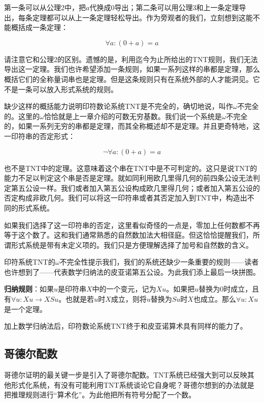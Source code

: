 \documentclass{article}
\begin{document}
第一条可以从公理2中，把$a$代换成0导出；第二条可以用公理3和上一条定理导出，每条定理都可以从上一条定理轻松导出。作为旁观者的我们，立刻想到这能不能概括成一条定理：

\[
\forall a: (0 + a) = a
\]

请注意它和公理2的区别。遗憾的是，利用迄今为止所给出的TNT规则，我们无法导出这一定理。我们也许希望添加一条规则，如果一系列这样的串都是定理，那么概括它们的全称量词串也是定理。但是这条规则只有在系统外部的人才能洞见。它不是一条可以放入形式系统的规则。

缺少这样的概括能力说明印符数论系统TNT是不完全的，确切地说，叫作$\omega$不完全的。这里的$\omega$恰恰就是上一章介绍的可数无穷基数。我们说一个系统是$\omega$不完全的，如果一系列无穷的串都是定理，而其全称概述却不是定理。并且更奇特地，这一印符串的否定形式：

\[
\lnot \forall a: (0 + a) = a
\]

也不是TNT中的定理。这意味着这个串在TNT中是不可判定的。这只是说TNT的能力不足以判定这个串是否是定理。就如同利用欧几里得几何的前四条公设无法判定第五公设一样。我们或者加入第五公设构成欧几里得几何；或者加入第五公设的否定构成非欧几何。我们可以将这一印符串或者其否定加入到TNT中，构造出不同的形式系统。

如果我们选择了这一印符串的否定，这里看似奇怪的一点是，零加上任何数都不再等于这个数了。这和我们通常熟悉的自然数加法大相径庭。但这恰恰提醒我们，所谓形式系统是带有未定义项的。我们只是方便理解选择了加号和自然数的含义。

印符系统TNT的$\omega$不完全性提示我们，我们的系统还缺少一条重要的规则——读者也许想到了——代表数学归纳法的皮亚诺第五公设。为此我们添上最后一块拼图。

\textbf{归纳规则}：如果$u$是印符串$X$中的一个变元，记为$X{u}$。如果把$u$替换为0时成立，且有$\forall u: X{u} \to X{Su}$。也就是若$u$时$X$成立，则将$u$替换为$Su$时$X$也成立。那么$\forall u: X{u}$是一个定理。

加上数学归纳法后，印符数论系统TNT终于和皮亚诺算术具有同样的能力了。

\begin{Exercise}
\end{Exercise}

\subsection{哥德尔配数}

哥德尔证明的最关键一步是引入了哥德尔配数。TNT系统已经强大到可以反映其他形式化系统，有没有可能利用TNT系统谈论它自身呢？哥德尔想到的办法就是把推理规则进行“算术化”。为此他把所有符号分配了一个数。
\end{document}
